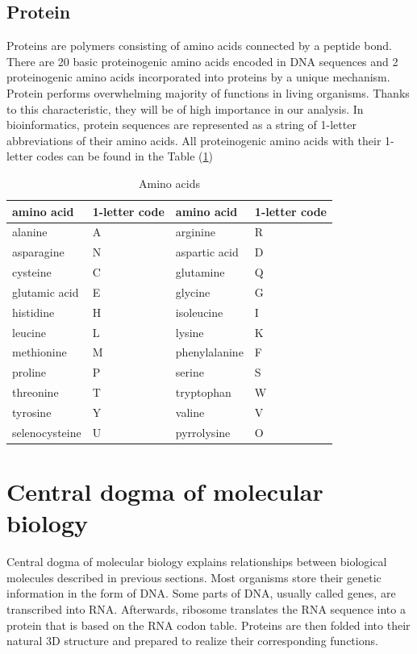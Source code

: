 \subsection{Protein}
Proteins are polymers consisting of amino acids connected by a peptide bond.
There are 20 basic proteinogenic amino acids encoded in DNA sequences and 2 proteinogenic amino acids incorporated into proteins by a unique mechanism.
Protein performs overwhelming majority of functions in living organisms.
Thanks to this characteristic, they will be of high importance in our analysis.
In bioinformatics, protein sequences are represented as a string of 1-letter abbreviations of their amino acids. All proteinogenic amino acids with their 1-letter codes can be found in the Table (\ref{tab:amino})

\begin{table}
 \centering
        \begin{tabular}{ l  l  l  l }
         \hline
         amino acid & 1-letter code & amino acid & 1-letter code \\
         \hline  
         alanine & A & arginine & R \\
         asparagine & N & aspartic acid & D \\
         cysteine & C & glutamine & Q \\
         glutamic acid & E & glycine & G \\
         histidine & H & isoleucine & I \\
         leucine & L & lysine & K \\
         methionine & M & phenylalanine & F \\
         proline & P & serine & S \\
         threonine & T & tryptophan & W \\
         tyrosine & Y & valine & V \\
         selenocysteine & U & pyrrolysine & O \\
         \hline
        \end{tabular}
        \caption{Amino acids}
        \label{tab:amino}
\end{table}



\section{Central dogma of molecular biology}
Central dogma of molecular biology explains relationships between biological molecules described in previous sections.
Most organisms store their genetic information in the form of DNA.
Some parts of DNA, usually called genes, are transcribed into RNA.
Afterwards, ribosome translates the RNA sequence into a protein that is based on the RNA codon table.
Proteins are then folded into their natural 3D structure and prepared to realize their corresponding functions.

